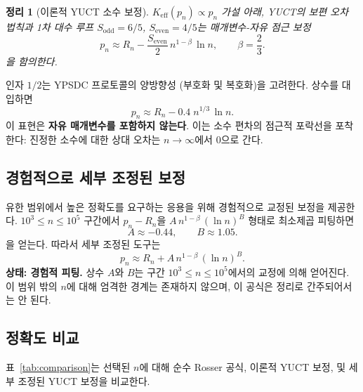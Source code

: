 \documentclass[11pt,a4paper]{article}
\newtheorem{theorem}{정리}
\newcommand{\Sodd}{S_{\mathrm{odd}}}
\newcommand{\Seven}{S_{\mathrm{even}}}
\begin{document}
	\begin{theorem}[이론적 YUCT 소수 보정]\label{thm:yuct-prime-theory}
		\(K_{\mathrm{eff}}(p_n) \propto p_n\) 가설 아래, YUCT의 보편 오차 법칙과 1차 대수 루프 \(\Sodd=6/5\), \(\Seven=4/5\)는 매개변수-자유 점근 보정
		\begin{equation}\label{eq:yuct-prime-theory}
			\boxed{ p_n \approx R_n - \frac{\Seven}{2}\, n^{1-\beta}\,\ln n },
			\qquad \beta = \frac{2}{3}.
		\end{equation}
		을 함의한다.
	\end{theorem}
	
	인자 \(1/2\)는 YPSDC 프로토콜의 양방향성 (부호화 및 복호화)을 고려한다. 상수를 대입하면
	\[
	p_n \approx R_n - 0.4\; n^{1/3}\,\ln n .
	\]
	이 표현은 \textbf{자유 매개변수를 포함하지 않는다}. 이는 소수 편차의 점근적 포락선을 포착한다: 진정한 소수에 대한 상대 오차는 \(n\to\infty\)에서 0으로 간다.
	
	\subsection{경험적으로 세부 조정된 보정}
	유한 범위에서 높은 정확도를 요구하는 응용을 위해 경험적으로 교정된 보정을 제공한다. \(10^3 \le n \le 10^5\) 구간에서 \(p_n - R_n\)을 \(A\,n^{1-\beta}\,(\ln n)^B\) 형태로 최소제곱 피팅하면
	\[
	A \approx -0.44, \qquad B \approx 1.05.
	\]
	을 얻는다. 따라서 세부 조정된 도구는
	\begin{equation}\label{eq:yuct-prime-empirical}
		\boxed{ p_n \approx R_n + A\,n^{1-\beta}\,(\ln n)^B }.
	\end{equation}
	\textbf{상태: 경험적 피팅.} 상수 \(A\)와 \(B\)는 구간 \(10^3 \le n \le 10^5\)에서의 교정에 의해 얻어진다. 이 범위 밖의 \(n\)에 대해 엄격한 경계는 존재하지 않으며, 이 공식은 정리로 간주되어서는 안 된다.
	
	\subsection{정확도 비교}
	표~\ref{tab:comparison}는 선택된 \(n\)에 대해 순수 Rosser 공식, 이론적 YUCT 보정, 및 세부 조정된 YUCT 보정을 비교한다.
	
\end{document}
